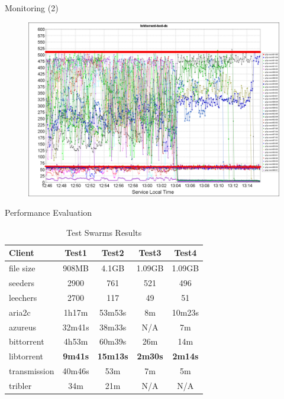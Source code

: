 \documentclass{beamer}
\begin{document}
\begin{frame}{Monitoring (2)}
  \begin{figure}
    \includegraphics[scale=0.15]{img/test-monalisa-virt-env-stop}
  \end{figure}
\end{frame}

\begin{frame}{Performance Evaluation}
  \begin{table}[ht]
    \centering
    \begin{tabular}{@{}lcccc@{}}
      \toprule
      \textbf{Client} & \textbf{Test1} & \textbf{Test2} & \textbf{Test3} &
      \textbf{Test4} \\
      \midrule
      file size & 908MB & 4.1GB & 1.09GB & 1.09GB	\\
      seeders & 2900 & 761 & 521 & 496	\\
      leechers & 2700 & 117 & 49 & 51	\\
      \midrule
      aria2c & 1h17m & 53m53s & 8m & 10m23s	\\
      azureus & 32m41s & 38m33s & N/A & 7m	\\
      bittorrent & 4h53m & 60m39s & 26m & 14m	\\
      libtorrent & \textbf{9m41s} & \textbf{15m13s} & \textbf{2m30s} & \textbf{2m14s}	\\
      transmission & 40m46s & 53m & 7m & 5m	\\
      tribler & 34m & 21m & N/A & N/A		\\
      \bottomrule
    \end{tabular}
    \caption{Test Swarms Results}
    \label{table:testsw}
  \end{table}
\end{frame}
\end{document}
